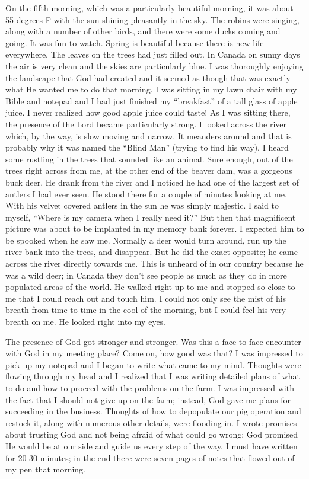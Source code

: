 \documentclass[oneside]{book}
\begin{document}
On the fifth morning, which was a particularly beautiful morning, it was about 55 degrees F with the sun shining pleasantly in the sky. The robins were singing, along with a number of other birds, and there were some ducks coming and going. It was fun to watch. Spring is beautiful because there is new life everywhere. The leaves on the trees had just filled out. In Canada on sunny days the air is very clean and the skies are particularly blue. I was thoroughly enjoying the landscape that God had created and it seemed as though that was exactly what He wanted me to do that morning. I was sitting in my lawn chair with my Bible and notepad and I had just finished my “breakfast” of a tall glass of apple juice. I never realized how good apple juice could taste! As I was sitting there, the presence of the Lord became particularly strong. I looked across the river which, by the way, is slow moving and narrow. It meanders around and that is probably why it was named the “Blind Man” (trying to find his way). I heard some rustling in the trees that sounded like an animal. Sure enough, out of the trees right across from me, at the other end of the beaver dam, was a gorgeous buck deer. He drank from the river and I noticed he had one of the largest set of antlers I had ever seen. He stood there for a couple of minutes looking at me. With his velvet covered antlers in the sun he was simply majestic. I said to myself, “Where is my camera when I really need it?” But then that magnificent picture was about to be implanted in my memory bank forever. I expected him to be spooked when he saw me. Normally a deer would turn around, run up the river bank into the trees, and disappear. But he did the exact opposite; he came across the river directly towards me. This is unheard of in our country because he was a wild deer; in Canada they don't see people as much as they do in more populated areas of the world. He walked right up to me and stopped so close to me that I could reach out and touch him. I could not only see the mist of his breath from time to time in the cool of the morning, but I could feel his very breath on me. He looked right into my eyes. 

The presence of God got stronger and stronger. Was this a face-to-face encounter with God in my meeting place? Come on, how good was that? I was impressed to pick up my notepad and I began to write what came to my mind. Thoughts were flowing through my head and I realized that I was writing detailed plans of what to do and how to proceed with the problems on the farm. I was impressed with the fact that I should not give up on the farm; instead, God gave me plans for succeeding in the business. Thoughts of how to depopulate our pig operation and restock it, along with numerous other details, were flooding in. I wrote promises about trusting God and not being afraid of what could go wrong; God promised He would be at our side and guide us every step of the way. I must have written for 20-30 minutes; in the end there were seven pages of notes that flowed out of my pen that morning. 
\end{document}
